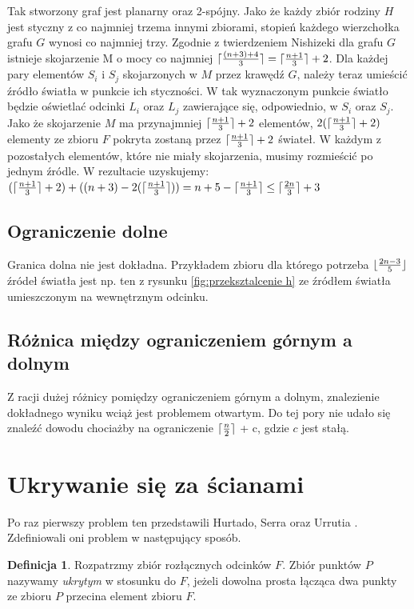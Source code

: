 \documentclass[brudnopis]{xmgr}
\DeclarePairedDelimiter\ceil{\lceil}{\rceil}
\DeclarePairedDelimiter\floor{\lfloor}{\rfloor}
\theoremstyle{definition}
\newtheorem{Definicja}{Definicja}
\begin{document}
Tak stworzony graf jest planarny oraz 2-spójny. Jako że każdy zbiór rodziny $H$ jest styczny z co najmniej trzema innymi zbiorami, stopień każdego wierzchołka grafu $G$ wynosi co najmniej trzy. Zgodnie z twierdzeniem Nishizeki \cite{nishizeki} dla grafu $G$ istnieje skojarzenie M o mocy co najmniej $\ceil{\frac{(n+3)+4}{3}} = \ceil{\frac{n+1}{3}}  + 2$. Dla każdej pary elementów $S_i$ i $S_j$ skojarzonych w $M$ przez krawędź $G$, należy teraz umieścić źródło światła w punkcie ich styczności. W tak wyznaczonym punkcie światło będzie oświetlać odcinki $L_i$ oraz $L_j$ zawierające się, odpowiednio, w $S_i$ oraz $S_j$. Jako że skojarzenie $M$ ma przynajmniej $\ceil{\frac{n+1}{3}} + 2$ elementów, $2(\ceil{\frac{n+1}{3}} + 2)$ elementy ze zbioru $F$ pokryta zostaną przez $\ceil{\frac{n+1}{3}} + 2$ świateł. W każdym z pozostałych elementów, które nie miały skojarzenia, musimy rozmieścić po jednym źródle. W rezultacie uzyskujemy:
$(\ceil{\frac{n+1}{3}} + 2) + ((n + 3) - 2(\ceil{\frac{n+1}{3}})) = n + 5 - \ceil{\frac{n+1}{3}} \le \ceil{\frac{2n}{3}} + 3$

\subsection{Ograniczenie dolne}
\indent Granica dolna nie jest dokładna. Przykładem zbioru dla którego potrzeba $\floor{\frac{2n-3}{5}}$ źródeł światła jest np. ten z rysunku \ref{fig:przeksztalcenie h} ze źródłem światła umieszczonym na wewnętrznym odcinku.

\subsection{Różnica między ograniczeniem górnym a dolnym}
Z racji dużej różnicy pomiędzy ograniczeniem górnym a dolnym, znalezienie dokładnego wyniku wciąż jest problemem otwartym. Do tej pory nie udało się znaleźć dowodu chociażby na ograniczenie $\ceil{\frac{n}{2}}$ + c, gdzie $c$ jest stałą.

\section{Ukrywanie się za ścianami}
Po raz pierwszy problem ten przedstawili Hurtado, Serra oraz Urrutia \cite{sciany}. Zdefiniowali oni problem w następujący sposób.

\begin{Definicja}\label{ukrywanie definicja}
 Rozpatrzmy zbiór rozłącznych odcinków $F$. Zbiór punktów $P$ nazywamy \emph{ukrytym} w stosunku do $F$, jeżeli dowolna prosta łącząca dwa punkty ze zbioru $P$ przecina element zbioru $F$.
\end{Definicja}
\end{document}

